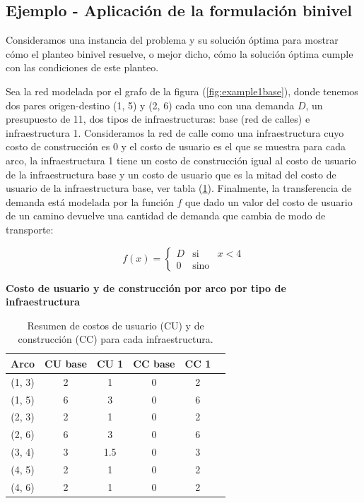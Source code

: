 \documentclass{article}
\begin{document}
  \subsection{Ejemplo - Aplicación de la formulación binivel}

  Consideramos una instancia del problema y su solución óptima para mostrar cómo el planteo binivel resuelve, o mejor dicho, cómo la solución óptima cumple con las condiciones de este planteo.

  Sea la red modelada por el grafo de la figura (\ref{fig:example1base}), donde tenemos dos pares origen-destino (1, 5) y (2, 6) cada uno con una demanda $D$, un presupuesto de 11, dos tipos de infraestructuras: base (red de calles) e infraestructura 1. Consideramos la red de calle como una infraestructura cuyo costo de construcción es 0 y el costo de usuario es el que se muestra para cada arco, la infraestructura 1 tiene un costo de construcción igual al costo de usuario de la infraestructura base y un costo de usuario que es la mitad del costo de usuario de la infraestructura base, ver tabla (\ref{table:example1arccosts}). Finalmente, la transferencia de demanda está modelada por la función $f$ que dado un valor del costo de usuario de un camino devuelve una cantidad de demanda que cambia de modo de transporte:

  $$
    f(x) = \left\{ \begin{array}{lcr}
            D & \mbox{si}   & x < 4 \\
            0 & \mbox{sino} &
    \end{array}
    \right.
  $$

  \begin{table}[h!]
    \centering
      \caption*{{\bf Costo de usuario y de construcción por arco por tipo de infraestructura}}
    \begin{tabular}{cccccc}
      \toprule
      Arco & CU base & CU 1 & CC base & CC 1 & \\
      \midrule
        (1, 3) & 2 & 1   & 0 & 2 \\
        (1, 5) & 6 & 3   & 0 & 6 \\
        (2, 3) & 2 & 1   & 0 & 2 \\
        (2, 6) & 6 & 3   & 0 & 6 \\
        (3, 4) & 3 & 1.5 & 0 & 3 \\
        (4, 5) & 2 & 1   & 0 & 2 \\
        (4, 6) & 2 & 1   & 0 & 2 \\
      \bottomrule
    \end{tabular}
      \caption{Resumen de costos de usuario (CU) y de construcción (CC) para cada infraestructura.}\label{table:example1arccosts}
  \end{table}
\end{document}

